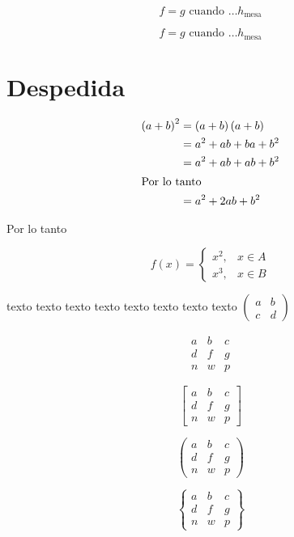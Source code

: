 \documentclass[a4paper]{report}
\numberwithin{equation}{section}
\theoremstyle{definition}
\theoremstyle{plain}
\theoremstyle{remark}
\begin{document}
\[ f=g\mbox{ cuando }\dots h_{\mbox{mesa}} \]%

\[ f=g\text{ cuando }\dots h_{\text{mesa}} \]%

\section{Despedida}

\begin{align}
{\left(a+b\right)}^{2}&=\left(a+b\right)\left(a+b\right)\\
&=a^{2}+ab+ba+b^{2}\notag\\
&=a^{2}+ab+ab+b^{2}\\
\intertext{Por lo tanto}
&=a^{2}+2ab+b^{2}
\end{align}

Por lo tanto

\begin{equation}
f(x)=\begin{cases}
x^{2}, & x\in A \\
x^{3}, & x\in B
\end{cases}
\end{equation}

texto texto texto texto texto texto texto texto \(\left(\begin{smallmatrix}
a & b \\
c & d
\end{smallmatrix}\right)\)%

\[ \begin{matrix}
a & b & c \\
d & f & g \\
n & w & p 
\end{matrix} \]

\[ \begin{bmatrix}
a & b & c \\
d & f & g \\
n & w & p 
\end{bmatrix} \]

\[ \begin{pmatrix}
a & b & c \\
d & f & g \\
n & w & p 
\end{pmatrix} \]

\[ \begin{Bmatrix}
a & b & c \\
d & f & g \\
n & w & p 
\end{Bmatrix} \]
\end{document}
